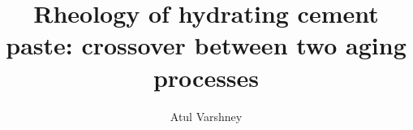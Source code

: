 \documentclass[final,5p,twocolumn]{elsarticle}
\begin{document}
	
	\begin{frontmatter}
		
		
		
		\title{Rheology of  hydrating cement paste: crossover between two aging processes}
		
		
		\author[lab1,lab2]{Atul Varshney}
		\address[lab1]{Department of Condensed Matter Physics and Materials Science, Tata Institute of Fundamental Research, Homi Bhabha Road, Mumbai 400 005, India}
		\address[lab2]{Department of Physics of Complex Systems, Weizmann Institute of Science, Rehovot, Israel 76100}
		

\end{frontmatter}
\end{document}
